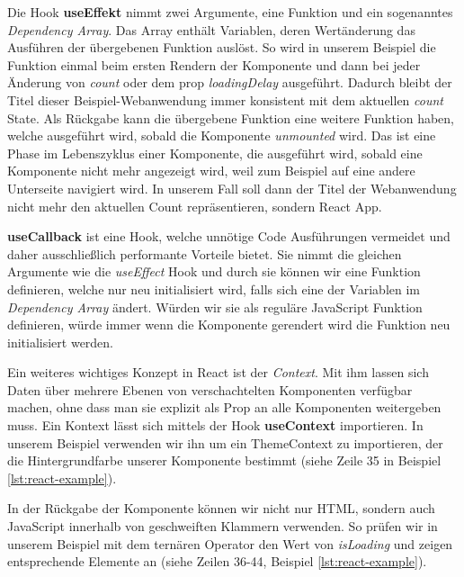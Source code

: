 Die Hook \textbf{useEffekt} nimmt zwei Argumente, eine Funktion und ein sogenanntes \textit{Dependency Array}. Das Array enthält Variablen, deren Wertänderung das Ausführen der übergebenen Funktion auslöst. So wird in unserem Beispiel die Funktion einmal beim ersten Rendern der Komponente und dann bei jeder Änderung von \textit{count} oder dem prop \textit{loadingDelay} ausgeführt. Dadurch bleibt der Titel dieser Beispiel-Webanwendung immer konsistent mit dem aktuellen \textit{count} State. Als Rückgabe kann die übergebene Funktion eine weitere Funktion haben, welche ausgeführt wird, sobald die Komponente \textit{unmounted} wird. Das ist eine Phase im Lebenszyklus einer Komponente, die ausgeführt wird, sobald eine Komponente nicht mehr angezeigt wird, weil zum Beispiel auf eine andere Unterseite navigiert wird. In unserem Fall soll dann der Titel der Webanwendung nicht mehr den aktuellen Count repräsentieren, sondern \glqq React App\grqq .

\textbf{useCallback} ist eine Hook, welche unnötige Code Ausführungen vermeidet und daher ausschließlich performante Vorteile bietet. Sie nimmt die gleichen Argumente wie die \textit{useEffect} Hook und durch sie können wir eine Funktion definieren, welche nur neu initialisiert wird, falls sich eine der Variablen im \textit{Dependency Array} ändert. Würden wir sie als reguläre JavaScript Funktion definieren, würde immer wenn die Komponente gerendert wird die Funktion neu initialisiert werden.

Ein weiteres wichtiges Konzept in React ist der \textit{Context}. Mit ihm lassen sich Daten über mehrere Ebenen von verschachtelten Komponenten verfügbar machen, ohne dass man sie explizit als Prop an alle Komponenten weitergeben muss. Ein Kontext lässt sich mittels der Hook \textbf{useContext} importieren. In unserem Beispiel verwenden wir ihn um ein ThemeContext zu importieren, der die Hintergrundfarbe unserer Komponente bestimmt (siehe Zeile 35 in Beispiel \ref{lst:react-example}).

In der Rückgabe der Komponente können wir nicht nur HTML, sondern auch JavaScript innerhalb von geschweiften Klammern verwenden. So prüfen wir in unserem Beispiel mit dem ternären Operator den Wert von \textit{isLoading} und zeigen entsprechende Elemente an (siehe Zeilen 36-44, Beispiel \ref{lst:react-example}).

